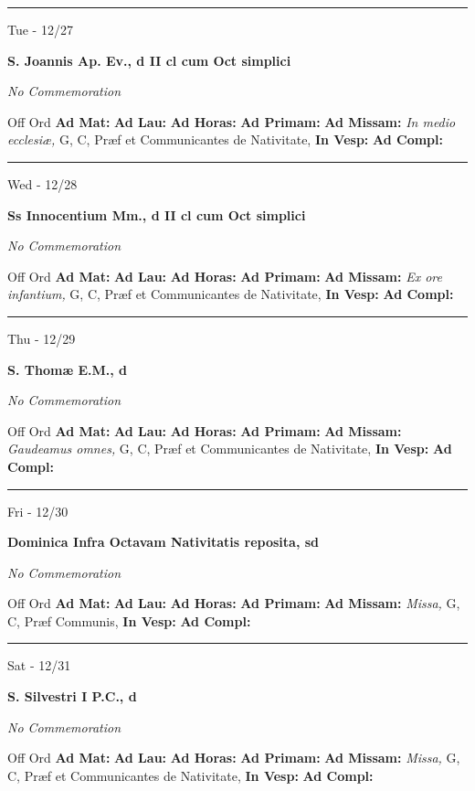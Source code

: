 \documentclass[letterpaper, 10pt]{article}
\begin{document}
\hrule
\begin{center}
Tue - 12/27
\end{center}\textbf{ \large S. Joannis Ap. Ev., \textnormal{\normalsize d II cl cum Oct simplici}}

\textit{No Commemoration}\begin{justify}
Off Ord
\textbf{Ad Mat: }
\textbf{Ad Lau: }
\textbf{Ad Horas: }
\textbf{Ad Primam: }
\textbf{Ad Missam:} \textit{In medio ecclesiæ, } G, C, Præf et Communicantes de Nativitate, 
\textbf{In Vesp: }
\textbf{Ad Compl: }\end{justify}



\hrule
\begin{center}
Wed - 12/28
\end{center}\textbf{ \large Ss Innocentium Mm., \textnormal{\normalsize d II cl cum Oct simplici}}

\textit{No Commemoration}\begin{justify}
Off Ord
\textbf{Ad Mat: }
\textbf{Ad Lau: }
\textbf{Ad Horas: }
\textbf{Ad Primam: }
\textbf{Ad Missam:} \textit{Ex ore infantium, } G, C, Præf et Communicantes de Nativitate, 
\textbf{In Vesp: }
\textbf{Ad Compl: }\end{justify}



\hrule
\begin{center}
Thu - 12/29
\end{center}\textbf{ \large S. Thomæ E.M., \textnormal{\normalsize d}}

\textit{No Commemoration}\begin{justify}
Off Ord
\textbf{Ad Mat: }
\textbf{Ad Lau: }
\textbf{Ad Horas: }
\textbf{Ad Primam: }
\textbf{Ad Missam:} \textit{Gaudeamus omnes, } G, C, Præf et Communicantes de Nativitate, 
\textbf{In Vesp: }
\textbf{Ad Compl: }\end{justify}



\hrule
\begin{center}
Fri - 12/30
\end{center}\textbf{ \large Dominica Infra Octavam Nativitatis reposita, \textnormal{\normalsize sd}}

\textit{No Commemoration}\begin{justify}
Off Ord
\textbf{Ad Mat: }
\textbf{Ad Lau: }
\textbf{Ad Horas: }
\textbf{Ad Primam: }
\textbf{Ad Missam:} \textit{Missa, } G, C, Præf Communis, 
\textbf{In Vesp: }
\textbf{Ad Compl: }\end{justify}



\hrule
\begin{center}
Sat - 12/31
\end{center}\textbf{ \large S. Silvestri I P.C., \textnormal{\normalsize d}}

\textit{No Commemoration}\begin{justify}
Off Ord
\textbf{Ad Mat: }
\textbf{Ad Lau: }
\textbf{Ad Horas: }
\textbf{Ad Primam: }
\textbf{Ad Missam:} \textit{Missa, } G, C, Præf et Communicantes de Nativitate, 
\textbf{In Vesp: }
\textbf{Ad Compl: }\end{justify}
\end{document}
